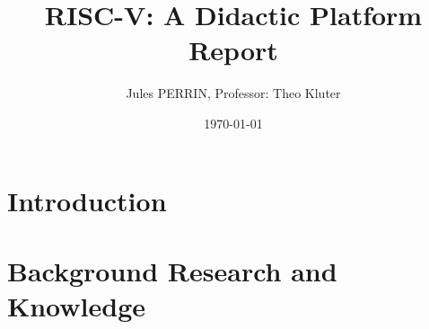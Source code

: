 \documentclass[12pt]{article}
\title{RISC-V: A Didactic Platform \\
Report}
\author{Jules PERRIN, Professor: Theo Kluter}
\date{\today}
\begin{document}
\maketitle
\tableofcontents

\section{Introduction}




\section{Background Research and Knowledge}





\printbibliography
\end{document}
